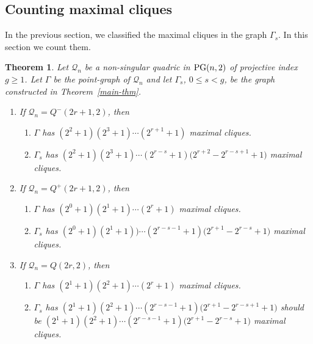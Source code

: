 \documentclass[12pt]{article}
\newtheorem{theorem}{Theorem}[section]
\newcommand{\Q}{\mathscr Q}
\newcommand\PG{{\rm PG}}
\newcommand{\Label}{\label}
\newcommand\red[1]{{\color{red} #1}}
\begin{document}
\subsection{Counting maximal cliques}

In the previous section, we classified the maximal cliques in the  graph $\Gamma_s$. In this section we count them.


\begin{theorem}\Label{thm-max-cliq}
 Let $\Q_n$ be a non-singular quadric in $\PG(n,2)$ of projective index $g\geq1$. Let $\Gamma$ be the point-graph of $\Q_n$ and let $\Gamma_s$, $0\leq s<g$,
 be the graph constructed in Theorem~\ref{main-thm}.
\begin{enumerate}
\item If $\Q_n=Q^-(2r+1,2)$, then 
\begin{enumerate}
\item  $\Gamma$ has $(2^2+1)(2^3+1)\cdots(2^{r+1}+1)$ maximal cliques.
\item $\Gamma_s$ has $(2^2+1)(2^3+1)\cdots(2^{r-s}+1)\big(2^{r+2}-2^{r-s+1}+1\big)$ maximal cliques.
\end{enumerate}
\item If $\Q_n=Q^+(2r+1,2)$, then 
\begin{enumerate}
\item  $\Gamma$ has $(2^0+1)(2^1+1)\cdots(2^{r}+1)$ maximal cliques.
\item $\Gamma_s$ has $(2^0+1)(2^1+1))\cdots(2^{r-s-1}+1)\big(2^{r+1}-2^{r-s}+1\big)$ maximal cliques.
\end{enumerate}
\item If $\Q_n=Q(2r,2)$, then 
\begin{enumerate}
\item  $\Gamma$ has $(2^1+1)(2^2+1)\cdots(2^{r}+1)$ maximal cliques.
\item $\Gamma_s$ has $(2^1+1)(2^2+1)\cdots(2^{r-s-1}+1)\big(2^{r+1}-2^{r-s+1}+1\big)$ \red{should be
 $(2^1+1)(2^2+1)\cdots(2^{r-s-1}+1)\big(2^{r+1}-2^{r-s}+1\big)$ } 
maximal cliques.
\end{enumerate}
\end{enumerate}
\end{theorem}
\end{document}
